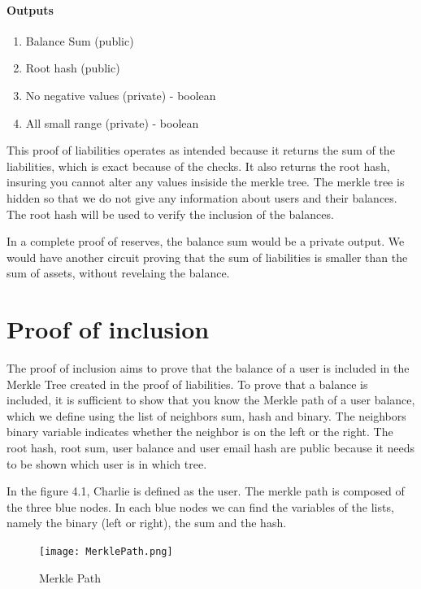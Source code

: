 \paragraph{Outputs}
\begin{enumerate}
    \item Balance Sum (public)
    \item Root hash (public)
    \item No negative values (private) - boolean
    \item All small range (private) - boolean
    \end{enumerate}

This proof of liabilities operates as intended because it returns the sum of the liabilities, which is exact because of the checks. 
It also returns the root hash, insuring you cannot alter any values insiside the merkle tree. The merkle tree is hidden so that we do not
give any information about users and their balances.
The root hash will be used to verify the inclusion of the balances.


In a complete proof of reserves, the balance sum would be a private output. We would have another circuit proving that the sum of liabilities is smaller
than the sum of assets, without revelaing the balance.


\section{Proof of inclusion} 
The proof of inclusion aims to prove that the balance of a user is included in the Merkle Tree created in the proof of liabilities.
To prove that a balance is included, it is sufficient to show that you know the Merkle path of a user balance,
which we define using the list of neighbors sum, hash and binary. 
The neighbors binary variable indicates whether the neighbor is on the left or the right. 
The root hash, root sum, user balance and user email hash are public because it needs to be shown which user is in which tree.

In the figure 4.1, Charlie is defined as the user. The merkle path is composed of the three blue nodes. In each blue nodes we can find the variables of the lists,
namely the binary (left or right), the sum and the hash.
\begin{figure}[H]
    \centering
    \texttt{[image: MerklePath.png]}
    \caption{Merkle Path \cite{BM22}}
    \label{overflow}
    \end{figure}


